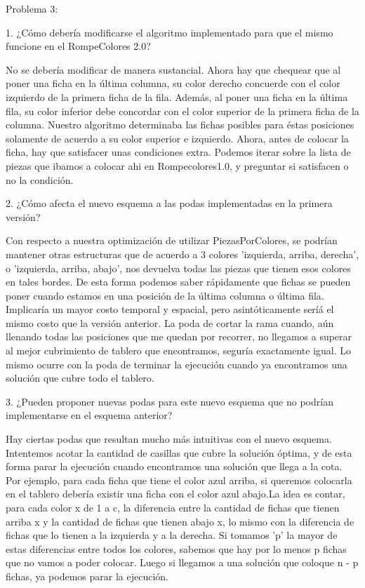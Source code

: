 \documentclass[11pt, a4paper, twoside]{article}
\begin{document}
{}

Problema 3:

1. ¿Cómo debería modificarse el algoritmo implementado para que el mismo funcione en el RompeColores 2.0?

No se debería modificar de manera sustancial. Ahora hay que chequear que al poner una ficha en la última columna, su color derecho concuerde con el color izquierdo de la primera ficha de la fila. Además, al poner una ficha en la última fila, su color inferior debe concordar con el color superior de la primera ficha de la columna.
Nuestro algoritmo determinaba las fichas posibles para éstas posiciones solamente de acuerdo a su color superior e izquierdo. Ahora, antes de colocar la ficha, hay que satisfacer unas condiciones extra. Podemos iterar sobre la lista de piezas que ibamos a colocar ahi en Rompecolores1.0, y preguntar si satisfacen o no la condición.

2. ¿Cómo afecta el nuevo esquema a las podas implementadas en la primera versión?

Con respecto a nuestra optimización de utilizar PiezasPorColores, se podrían mantener otras estructuras que de acuerdo a 3 colores 'izquierda, arriba, derecha', o 'izquierda, arriba, abajo', nos devuelva todas las piezas que tienen esos colores en tales bordes. De esta forma podemos saber rápidamente que fichas se pueden poner cuando estamos en una posición de la última columna o última fila. Implicaría un mayor costo temporal y espacial, pero asintóticamente seríá el mismo costo que la versión anterior.
La poda de cortar la rama cuando, aún llenando todas las posiciones que me quedan por recorrer, no llegamos a superar al mejor cubrimiento de tablero que encontramos, seguría exactamente igual. Lo mismo ocurre con la poda de terminar la ejecución cuando ya encontramos una solución que cubre todo el tablero.

3. ¿Pueden proponer nuevas podas para este nuevo esquema que no podrían implementarse en el esquema anterior?

Hay ciertas podas que resultan mucho más intuitivas con el nuevo esquema. Intentemos acotar la cantidad de casillas que cubre la solución óptima, y de esta forma parar la ejecución cuando encontramos una solución que llega a la cota.
Por ejemplo, para cada ficha que tiene el color azul arriba, si queremos colocarla en el tablero debería existir una ficha con el color azul abajo.La idea es contar, para cada color x de 1 a c, la diferencia entre la cantidad de fichas que tienen arriba x y la cantidad de fichas que tienen abajo x, lo mismo con la diferencia de fichas que lo tienen a la izquierda y a la derecha. Si tomamos 'p' la mayor de estas diferencias entre todos los colores, sabemos que hay por lo menos p fichas que no vamos a poder colocar. Luego si llegamos a una solución que coloque n - p fichas, ya podemos parar la ejecución.

\end{document}
